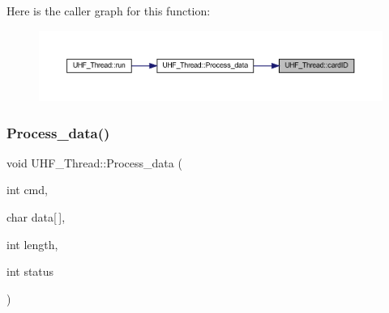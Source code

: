 Here is the caller graph for this function\+:
\nopagebreak
\begin{figure}[H]
\begin{center}
\leavevmode
\includegraphics[width=350pt]{class_u_h_f___thread_a4382c7acd8bb18adbaa580d3fb76ae17_icgraph}
\end{center}
\end{figure}
\mbox{\label{class_u_h_f___thread_a5e287beadcbcccffcd5859fa25263785}} 
\subsubsection{\texorpdfstring{Process\_data()}{Process\_data()}}
{\footnotesize\ttfamily void U\+H\+F\+\_\+\+Thread\+::\+Process\+\_\+data (\begin{DoxyParamCaption}\item[{int}]{cmd,  }\item[{char}]{data\mbox{[}$\,$\mbox{]},  }\item[{int}]{length,  }\item[{int}]{status }\end{DoxyParamCaption})}

